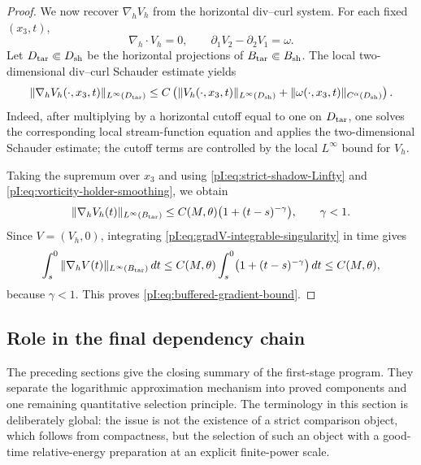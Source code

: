 \documentclass[11pt]{article}
\numberwithin{equation}{section}
\theoremstyle{plain}
\theoremstyle{definition}
\theoremstyle{remark}
\newcommand{\nabh}{\nabla_h}
\newcommand{\divh}{\nabla_h\!\cdot}
\begin{document}
\begin{proof}
We now recover $\nabh V_h$ from the horizontal div--curl system.  For each fixed $(x_3,t)$,
\[
        \divh V_h=0,\qquad \partial_1V_2-\partial_2V_1=\omega .
\]
Let $D_{\rm tar}\Subset D_{\rm sh}$ be the horizontal projections of $B_{\rm tar}\Subset B_{\rm sh}$.  The local two-dimensional div--curl Schauder estimate yields
\begin{equation}\label{pI:eq:horizontal-divcurl-schauder}
        \|\nabh V_h(\cdot,x_3,t)\|_{L^\infty(D_{\rm tar})}
        \le C
        \left(
        \|V_h(\cdot,x_3,t)\|_{L^\infty(D_{\rm sh})}
        +\|\omega(\cdot,x_3,t)\|_{C^\alpha(D_{\rm sh})}
        \right).
\end{equation}
Indeed, after multiplying by a horizontal cutoff equal to one on $D_{\rm tar}$, one solves the corresponding local stream-function equation and applies the two-dimensional Schauder estimate; the cutoff terms are controlled by the local $L^\infty$ bound for $V_h$.

Taking the supremum over $x_3$ and using \eqref{pI:eq:strict-shadow-Linfty} and \eqref{pI:eq:vorticity-holder-smoothing}, we obtain
\begin{equation}\label{pI:eq:gradV-integrable-singularity}
        \|\nabh V_h(t)\|_{L^\infty(B_{\rm tar})}
        \le C(M,\theta)\bigl(1+(t-s)^{-\gamma}\bigr),
        \qquad \gamma<1.
\end{equation}
Since $V=(V_h,0)$, integrating \eqref{pI:eq:gradV-integrable-singularity} in time gives
\[
        \int_s^0\|\nabh V(t)\|_{L^\infty(B_{\rm tar})}\,dt
        \le C(M,\theta)
        \int_s^0\bigl(1+(t-s)^{-\gamma}\bigr)\,dt
        \le C(M,\theta),
\]
because $\gamma<1$.  This proves \eqref{pI:eq:buffered-gradient-bound}.
\end{proof}


\subsection{Role in the final dependency chain}\label{pI:sec:roadmap}

The preceding sections give the closing summary of the first-stage program.  They separate the logarithmic approximation mechanism into proved components and one remaining quantitative selection principle.  The terminology in this section is deliberately global: the issue is not the existence of a strict comparison object, which follows from compactness, but the selection of such an object with a good-time relative-energy preparation at an explicit finite-power scale.
\end{document}
